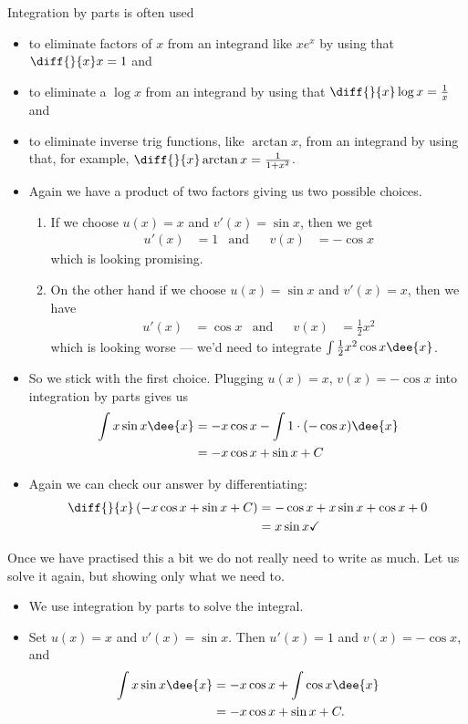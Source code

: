 Integration by parts is often used
\begin{itemize}
\item to eliminate factors of $x$ from an integrand like $xe^x$ by using that
$\diff{}{x}x=1$ and
\item to eliminate a $\log x$ from an integrand by using that
$\diff{}{x}\log x=\frac{1}{x}$ and
\item to eliminate inverse trig functions, like $\arctan x$, from an
integrand by using that, for example, $\diff{}{x}\arctan x=\frac{1}{1+x^2}$.
\end{itemize}

\begin{eg}
\soln
\begin{itemize}
 \item Again we have a product of two factors giving us two possible choices.
\begin{enumerate}[(1)]
 \item If we choose $u(x)=x$ and $v'(x)=\sin x$, then we get
\begin{align*}
  u'(x) &=1 &\text{and} && v(x) &= -\cos x
\end{align*}
which is looking promising.
\item On the other hand if we choose $u(x)=\sin x$ and $v'(x)=x$, then we have
\begin{align*}
  u'(x)&=\cos x &\text{and} && v(x) &= \frac{1}{2}x^2
\end{align*}
which is looking worse --- we'd need to integrate $\int \frac{1}{2}x^2 \cos x \dee{x}$.
\end{enumerate}
\item So we stick with the first choice. Plugging $u(x)=x$, $v(x)=-\cos x$  into
integration by parts gives us
\begin{align*}
  \int x \sin x \dee{x} &= -x\cos x  - \int 1 \cdot (-\cos x) \dee{x} \\
  &= -x\cos x + \sin x + C
\end{align*}
\item Again we can check our answer by differentiating:
\begin{align*}
  \diff{}{x}\left( -x\cos x + \sin x + C \right)
  &= -\cos x + x\sin x + \cos x + 0 \\
  &= x \sin x \checkmark
\end{align*}
\end{itemize}

Once we have practised this a bit we do not really need to write as much. Let us solve it
again, but showing only what we need to.

\soln
\begin{itemize}
 \item We use integration by parts to solve the integral.
 \item Set $u(x)=x$ and $v'(x)=\sin x$. Then $u'(x)=1$ and $v(x)=-\cos x$, and
\begin{align*}
  \int x \sin x \dee{x} &= -x\cos x + \int \cos x \dee{x} \\
  &= -x\cos x + \sin x + C.
\end{align*}
\end{itemize}
\end{eg}

